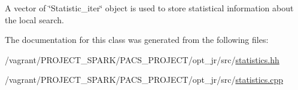 A vector of \char`\"{}\-Statistic\-\_\-iter\char`\"{} object is used to store statistical information about the local search. 



The documentation for this class was generated from the following files\-:\begin{DoxyCompactItemize}
\item 
/vagrant/\-P\-R\-O\-J\-E\-C\-T\-\_\-\-S\-P\-A\-R\-K/\-P\-A\-C\-S\-\_\-\-P\-R\-O\-J\-E\-C\-T/opt\-\_\-jr/src/\hyperlink{statistics_8hh}{statistics.\-hh}\item 
/vagrant/\-P\-R\-O\-J\-E\-C\-T\-\_\-\-S\-P\-A\-R\-K/\-P\-A\-C\-S\-\_\-\-P\-R\-O\-J\-E\-C\-T/opt\-\_\-jr/src/\hyperlink{statistics_8cpp}{statistics.\-cpp}\end{DoxyCompactItemize}
